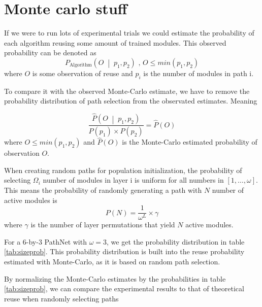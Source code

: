 \chapter{Monte carlo stuff}
If we were to run lots of experimental trials we could estimate the probability of each algorithm reusing some amount of trained modules. This observed probability can be denoted as
\begin{equation*}
    P_{\text{Algorithm}}\left(O\;\middle|\;p_{1}, p_{2}\right)\text{ ,  } O\leq min(p_{1}, p_{2})
\end{equation*}
where \(O\) is some observation of reuse and \(p_{i}\) is the number of modules in path i.

To compare it with the observed Monte-Carlo estimate, we have to remove the probability distribution of path selection from the observated estimates. Meaning

\begin{equation}
\frac{\hat{P}\left(O\;\middle|\;p_{1}, p_{2}\right)}{P(p_{1})\times P(p_{2})} = \hat{P}(O)
\label{eq:probabilityreuse}
\end{equation}
where \(O\leq min(p_{1}, p_{2})\) and \(\hat{P}(O)\) is the Monte-Carlo estimated probability of observation \(O\).

When creating random paths for population initialization, the probability of selecting \(\Omega_{i}\) number of modules in layer i is uniform for all numbers in \([1, \dots, \omega]\). This means the probability of randomly generating a path with \(N\) number of active modules is 
\begin{equation}
    P(N)=\frac{1}{\omega^{L}}\times\gamma    
\end{equation}
where \(\gamma\) is the number of layer permutations that yield \(N\) active modules. 



For a 6-by-3 PathNet with \(\omega=3\), we get the probability distribution in table \ref{tab:sizeprob}. This probability distribution is built into the reuse probability estimated with Monte-Carlo, as it is based on random path selection.

By normalizing the Monte-Carlo estimates by the probabilities in table \ref{tab:sizeprob}, we can compare the experimental results to that of theoretical reuse when randomly selecting paths


